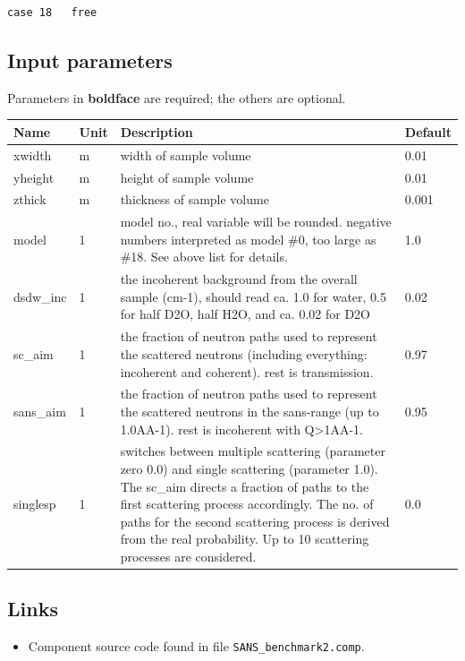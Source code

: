 \begin{verbatim}
case 18   free
\end{verbatim}

\subsection*{Input parameters}
Parameters in \textbf{boldface} are required; the others are optional.

\begin{longtable}{p{}p{}p{}p{}}
\toprule
\textbf{Name} & \textbf{Unit} & \textbf{Description} & \textbf{Default} \\
\midrule
\endhead
xwidth & m & width of sample volume & 0.01 \\
yheight & m & height of sample volume & 0.01 \\
zthick & m & thickness of sample volume & 0.001 \\
model & 1 & model no., real variable will be rounded. negative numbers interpreted as model \#0, too large as \#18. See above list for details. & 1.0 \\
dsdw\_inc & 1 & the incoherent background from the overall sample (cm-1), should read ca. 1.0 for water, 0.5 for half D2O, half H2O, and ca. 0.02 for D2O & 0.02 \\
sc\_aim & 1 & the fraction of neutron paths used to represent the scattered neutrons (including everything: incoherent and coherent). rest is transmission. & 0.97 \\
sans\_aim & 1 & the fraction of neutron paths used to represent the scattered neutrons in the sans-range (up to 1.0AA-1). rest is incoherent with Q\textgreater{}1AA-1. & 0.95 \\
singlesp & 1 & switches between multiple scattering (parameter zero 0.0) and single scattering (parameter 1.0). The sc\_aim directs a fraction of paths to the first scattering process accordingly. The no. of paths for the second scattering process is derived from the real probability. Up to 10 scattering processes are considered. & 0.0 \\
\bottomrule
\end{longtable}

\subsection*{Links}
\begin{itemize}
  \item Component source code found in file \texttt{SANS\_benchmark2.comp}.
\end{itemize}
